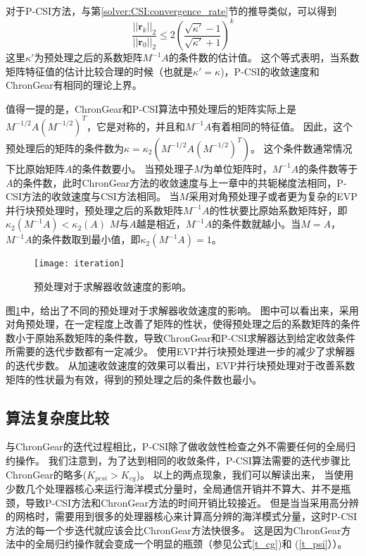 对于P-CSI方法，与第\ref{solver:CSI:convergence_rate}节的推导类似，可以得到
\begin{equation}
\label{pcsi_convergence}
\frac{||\textbf{r}_k||_2}{||\textbf{r}_0||_2}  \le 2(\frac{\sqrt{\kappa'}-1}{\sqrt{\kappa'}+1})^k
\end{equation}
这里$\kappa'$为预处理之后的系数矩阵${M^{-1}A}$的条件数的估计值。
这个等式表明，当系数矩阵特征值的估计比较合理的时候（也就是$\kappa' =\kappa$)，P-CSI的收敛速度和ChronGear有相同的理论上界。

值得一提的是，ChronGear和P-CSI算法中预处理后的矩阵实际上是$M^{-1/2}A(M^{-1/2})^T$，它是对称的，并且和$M^{-1}A$有着相同的特征值\cite{Shewchuk1994}。
因此，这个预处理后的矩阵的条件数为$\kappa =  \kappa_2(M^{-1/2}A(M^{-1/2})^T)$。
这个条件数通常情况下比原始矩阵$A$的条件数要小。 
当预处理子$M$为单位矩阵时，${M^{-1}A}$的条件数等于$A$的条件数，此时ChronGear方法的收敛速度与上一章中的共轭梯度法相同，P-CSI方法的收敛速度与CSI方法相同。
当$M$采用对角预处理子或者更为复杂的EVP并行块预处理时，预处理之后的系数矩阵${M^{-1}A}$的性状要比原始系数矩阵好，即
$\kappa_2({M^{-1}A}) < \kappa_2(A)$
$M$与$A$越是相近，$M^{-1}A$的条件数就越小。当$M = A$，$M^{-1}A$的条件数取到最小值，即$\kappa_2(M^{-1 }A ) = 1$。 

\begin {figure}[!t]
\begin{center}
\texttt{[image: iteration]}
\caption []{预处理对于求解器收敛速度的影响。\label{fig:iteration}}
\end{center}
\end {figure}
图\ref{fig:iteration}中，给出了不同的预处理对于求解器收敛速度的影响。 
图中可以看出来，采用对角预处理，在一定程度上改善了矩阵的性状，使得预处理之后的系数矩阵的条件数小于原始系数矩阵的条件数，导致ChronGear和P-CSI求解器达到给定收敛条件所需要的迭代步数都有一定减少。
使用EVP并行块预处理进一步的减少了求解器的迭代步数。
从加速收敛速度的效果可以看出，EVP并行块预处理对于改善系数矩阵的性状最为有效，得到的预处理之后的条件数也最小。

\subsection{算法复杂度比较}
\label{precond:ChronGear:comm}


与ChronGear的迭代过程相比，P-CSI除了做收敛性检查之外不需要任何的全局归约操作。 
我们注意到，为了达到相同的收敛条件，P-CSI算法需要的迭代步骤比ChronGear的略多($K_{pcsi} > K_{cg}$)。 
以上的两点现象，我们可以解读出来，
当使用少数几个处理器核心来运行海洋模式分量时，全局通信开销并不算大、并不是瓶颈，导致P-CSI方法和ChronGear方法的时间开销比较接近。
但是当当采用高分辨的网格时，需要用到很多的处理器核心来计算高分辨的海洋模式分量，这时P-CSI方法的每一个步迭代就应该会比ChronGear方法快很多。
这是因为ChronGear方法中的全局归约操作就会变成一个明显的瓶颈（参见公式\ref{t_cg})和
(\ref{t_psi}））。

